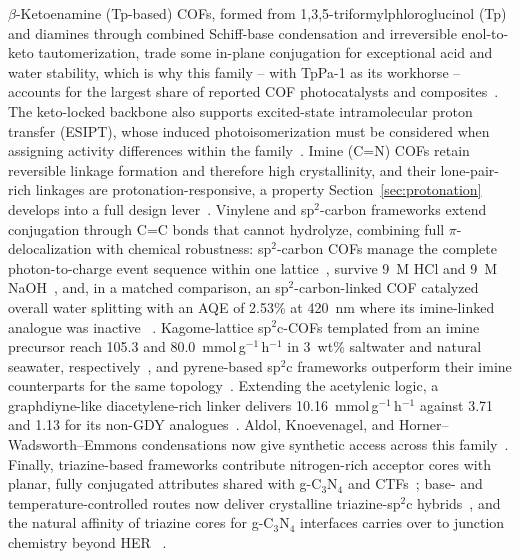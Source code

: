 $\beta$-Ketoenamine (Tp-based) COFs, formed from
1,3,5-triformylphloroglucinol (Tp) and diamines through combined Schiff-base
condensation and irreversible enol-to-keto tautomerization, trade some
in-plane conjugation for exceptional acid and water stability, which is why
this family -- with TpPa-1 as its workhorse -- accounts for the largest share
of reported COF photocatalysts and composites~\cite{xue2023research,
wang2023review,sujatha20251}. The keto-locked backbone also supports
excited-state intramolecular proton transfer (ESIPT), whose induced
photoisomerization must be considered when assigning activity differences
within the family~\cite{weng2023effect}. Imine (C=N) COFs retain reversible
linkage formation and therefore high crystallinity, and their lone-pair-rich
linkages are protonation-responsive, a property Section~\ref{sec:protonation}
develops into a full design lever~\cite{chen2024hydrogen,yang2021protonated,
luo2024asymmetric}. Vinylene and sp$^2$-carbon frameworks extend conjugation
through C=C bonds that cannot hydrolyze, combining full $\pi$-delocalization
with chemical robustness: sp$^2$-carbon COFs manage the complete
photon-to-charge event sequence within one lattice~\cite{jin20192d}, survive
9~M HCl and 9~M NaOH~\cite{chen2019designed}, and, in a matched comparison,
an sp$^2$-carbon-linked COF catalyzed overall water splitting with an AQE of
2.53\% at 420~nm where its imine-linked analogue was inactive
~\cite{cheng2023fully}. Kagome-lattice sp$^2$c-COFs templated from an
imine precursor reach 105.3 and 80.0~mmol\,g$^{-1}$\,h$^{-1}$ in 3~wt\%
saltwater and natural seawater, respectively~\cite{yu2025topology}, and
pyrene-based sp$^2$c frameworks outperform their imine counterparts for the
same topology~\cite{hao2024a,lu2024copper}. Extending the acetylenic logic,
a graphdiyne-like diacetylene-rich linker delivers
10.16~mmol\,g$^{-1}$\,h$^{-1}$ against 3.71 and 1.13 for its non-GDY
analogues~\cite{lin2024diacetylene}. Aldol, Knoevenagel, and
Horner--Wadsworth--Emmons condensations now give synthetic access across
this family~\cite{peng2025sp2}. Finally, triazine-based frameworks
contribute nitrogen-rich acceptor cores with planar, fully conjugated
attributes shared with g-C$_3$N$_4$ and CTFs~\cite{hao20212d}; base- and
temperature-controlled routes now deliver crystalline triazine-sp$^2$c
hybrids~\cite{zhang2023design}, and the natural affinity of triazine cores
for g-C$_3$N$_4$ interfaces carries over to junction chemistry beyond HER
~\cite{qi2024triazine}.

